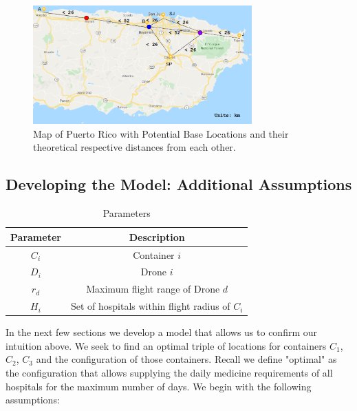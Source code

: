 \begin{figure}[!ht]
    \centering
    \includegraphics[width=0.75\textwidth]{base_graph_map.png}
    \caption{Map of Puerto Rico with Potential Base Locations and their theoretical respective distances from each other.}
    \label{fig:base_graph_map}
\end{figure}


\subsection{Developing the Model: Additional Assumptions}
\begin{table}[h]
    \centering
    \begin{tabular}{c|c}
    \hline Parameter & Description \\ 
    \hline $C_i$ & Container $i$ \\
    $D_i$ & Drone $i$ \\
    $r_d$ & Maximum flight range of Drone $d$ \\
    $H_i$ & Set of hospitals within flight radius of $C_i$ \\
    \end{tabular}
    \caption{Parameters}
    \label{tab:parameters}
\end{table}

\newenvironment{claim}[1]{\par\noindent\underline{Claim:}\space#1}{}
In the next few sections we develop a model that allows us to confirm our intuition above. We seek to find an optimal triple of locations for containers $C_1$, $C_2$, $C_3$ and the configuration of those containers. Recall we define "optimal" as the configuration that allows supplying the daily medicine requirements of all hospitals for the maximum number of days. We begin with the following assumptions:

